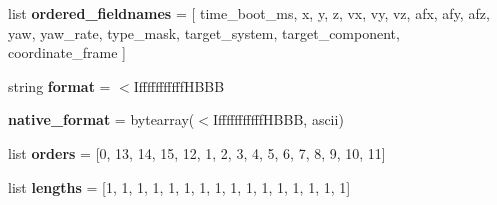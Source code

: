\begin{DoxyCompactItemize}
list {\bfseries ordered\+\_\+fieldnames} = \mbox{[} \textquotesingle{}time\+\_\+boot\+\_\+ms\textquotesingle{}, \textquotesingle{}x\textquotesingle{}, \textquotesingle{}y\textquotesingle{}, \textquotesingle{}z\textquotesingle{}, \textquotesingle{}vx\textquotesingle{}, \textquotesingle{}vy\textquotesingle{}, \textquotesingle{}vz\textquotesingle{}, \textquotesingle{}afx\textquotesingle{}, \textquotesingle{}afy\textquotesingle{}, \textquotesingle{}afz\textquotesingle{}, \textquotesingle{}yaw\textquotesingle{}, \textquotesingle{}yaw\+\_\+rate\textquotesingle{}, \textquotesingle{}type\+\_\+mask\textquotesingle{}, \textquotesingle{}target\+\_\+system\textquotesingle{}, \textquotesingle{}target\+\_\+component\textquotesingle{}, \textquotesingle{}coordinate\+\_\+frame\textquotesingle{} \mbox{]}
\item 
\mbox{\label{classpymavlink_1_1dialects_1_1v10_1_1MAVLink__set__position__target__local__ned__message_a382f8c59014d0229e38bc68a9d5a1d15}} 
string {\bfseries format} = \textquotesingle{}$<$Ifffffffffff\+H\+B\+BB\textquotesingle{}
\item 
\mbox{\label{classpymavlink_1_1dialects_1_1v10_1_1MAVLink__set__position__target__local__ned__message_af20797bb589394689c84d2de98753ae7}} 
{\bfseries native\+\_\+format} = bytearray(\textquotesingle{}$<$Ifffffffffff\+H\+B\+BB\textquotesingle{}, \textquotesingle{}ascii\textquotesingle{})
\item 
\mbox{\label{classpymavlink_1_1dialects_1_1v10_1_1MAVLink__set__position__target__local__ned__message_a5ceeeecd1a18adfc3ce438260fea4dff}} 
list {\bfseries orders} = \mbox{[}0, 13, 14, 15, 12, 1, 2, 3, 4, 5, 6, 7, 8, 9, 10, 11\mbox{]}
\item 
\mbox{\label{classpymavlink_1_1dialects_1_1v10_1_1MAVLink__set__position__target__local__ned__message_a82dc177aa54fb741be8094b8e5fbc54a}} 
list {\bfseries lengths} = \mbox{[}1, 1, 1, 1, 1, 1, 1, 1, 1, 1, 1, 1, 1, 1, 1, 1\mbox{]}
\item 
\mbox{\label{classpymavlink_1_1dialects_1_1v10_1_1MAVLink__set__position__target__local__ned__message_a40ea8a881d7d40f534d20a0b5c750d9c}} 

\end{DoxyCompactItemize}
